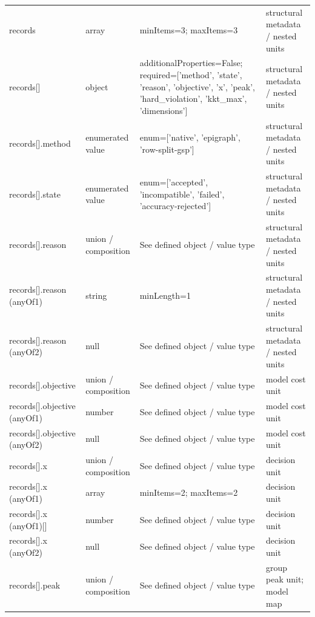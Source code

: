 \begin{longtable}{@{}>{\raggedright\arraybackslash}p{}>{\raggedright\arraybackslash}p{}>{\raggedright\arraybackslash}p{}>{\raggedright\arraybackslash}p{}@{}}
records & array & minItems=\allowbreak{}3; maxItems=\allowbreak{}3 & structural metadata /\allowbreak{} nested units\\
records[] & object & additionalProperties=\allowbreak{}False; required=\allowbreak{}['method', 'state', 'reason', 'objective', 'x', 'peak', 'hard\_\allowbreak{}violation', 'kkt\_\allowbreak{}max', 'dimensions'] & structural metadata /\allowbreak{} nested units\\
records[].\allowbreak{}method & enumerated value & enum=\allowbreak{}['native', 'epigraph', 'row-\allowbreak{}split-\allowbreak{}gsp'] & structural metadata /\allowbreak{} nested units\\
records[].\allowbreak{}state & enumerated value & enum=\allowbreak{}['accepted', 'incompatible', 'failed', 'accuracy-\allowbreak{}rejected'] & structural metadata /\allowbreak{} nested units\\
records[].\allowbreak{}reason & union /\allowbreak{} composition & See defined object /\allowbreak{} value type & structural metadata /\allowbreak{} nested units\\
records[].\allowbreak{}reason (anyOf1) & string & minLength=\allowbreak{}1 & structural metadata /\allowbreak{} nested units\\
records[].\allowbreak{}reason (anyOf2) & null & See defined object /\allowbreak{} value type & structural metadata /\allowbreak{} nested units\\
records[].\allowbreak{}objective & union /\allowbreak{} composition & See defined object /\allowbreak{} value type & model cost unit\\
records[].\allowbreak{}objective (anyOf1) & number & See defined object /\allowbreak{} value type & model cost unit\\
records[].\allowbreak{}objective (anyOf2) & null & See defined object /\allowbreak{} value type & model cost unit\\
records[].\allowbreak{}x & union /\allowbreak{} composition & See defined object /\allowbreak{} value type & decision unit\\
records[].\allowbreak{}x (anyOf1) & array & minItems=\allowbreak{}2; maxItems=\allowbreak{}2 & decision unit\\
records[].\allowbreak{}x (anyOf1)[] & number & See defined object /\allowbreak{} value type & decision unit\\
records[].\allowbreak{}x (anyOf2) & null & See defined object /\allowbreak{} value type & decision unit\\
records[].\allowbreak{}peak & union /\allowbreak{} composition & See defined object /\allowbreak{} value type & group peak unit; model map\\

\end{longtable}
